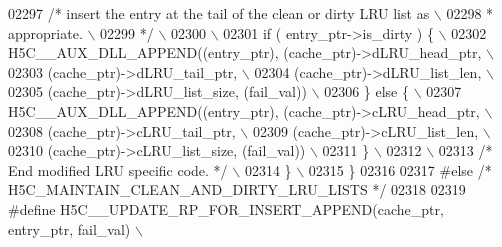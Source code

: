 \begin{DoxyCode}
02297 \textcolor{preprocessor}{        }\textcolor{comment}{/* insert the entry at the tail of the clean or dirty LRU list as  \(\backslash\)}
02298 \textcolor{comment}{         * appropriate.                                                    \(\backslash\)}
02299 \textcolor{comment}{         */}\textcolor{preprocessor}{                                                                \(\backslash\)}
02300 \textcolor{preprocessor}{                                                                           \(\backslash\)}
02301 \textcolor{preprocessor}{        if ( entry\_ptr->is\_dirty ) \{                                       \(\backslash\)}
02302 \textcolor{preprocessor}{            H5C\_\_AUX\_DLL\_APPEND((entry\_ptr), (cache\_ptr)->dLRU\_head\_ptr,   \(\backslash\)}
02303 \textcolor{preprocessor}{                                (cache\_ptr)->dLRU\_tail\_ptr,                \(\backslash\)}
02304 \textcolor{preprocessor}{                                (cache\_ptr)->dLRU\_list\_len,                \(\backslash\)}
02305 \textcolor{preprocessor}{                                (cache\_ptr)->dLRU\_list\_size, (fail\_val))   \(\backslash\)}
02306 \textcolor{preprocessor}{        \} else \{                                                           \(\backslash\)}
02307 \textcolor{preprocessor}{            H5C\_\_AUX\_DLL\_APPEND((entry\_ptr), (cache\_ptr)->cLRU\_head\_ptr,   \(\backslash\)}
02308 \textcolor{preprocessor}{                                (cache\_ptr)->cLRU\_tail\_ptr,                \(\backslash\)}
02309 \textcolor{preprocessor}{                                (cache\_ptr)->cLRU\_list\_len,                \(\backslash\)}
02310 \textcolor{preprocessor}{                                (cache\_ptr)->cLRU\_list\_size, (fail\_val))   \(\backslash\)}
02311 \textcolor{preprocessor}{        \}                                                                  \(\backslash\)}
02312 \textcolor{preprocessor}{                                                                           \(\backslash\)}
02313 \textcolor{preprocessor}{        }\textcolor{comment}{/* End modified LRU specific code. */}\textcolor{preprocessor}{                              \(\backslash\)}
02314 \textcolor{preprocessor}{    \}                                                                      \(\backslash\)}
02315 \textcolor{preprocessor}{\}}
02316 
02317 \textcolor{preprocessor}{#else }\textcolor{comment}{/* H5C\_MAINTAIN\_CLEAN\_AND\_DIRTY\_LRU\_LISTS */}\textcolor{preprocessor}{}
02318 
02319 \textcolor{preprocessor}{#define H5C\_\_UPDATE\_RP\_FOR\_INSERT\_APPEND(cache\_ptr, entry\_ptr, fail\_val)   \(\backslash\)}

\end{DoxyCode}
